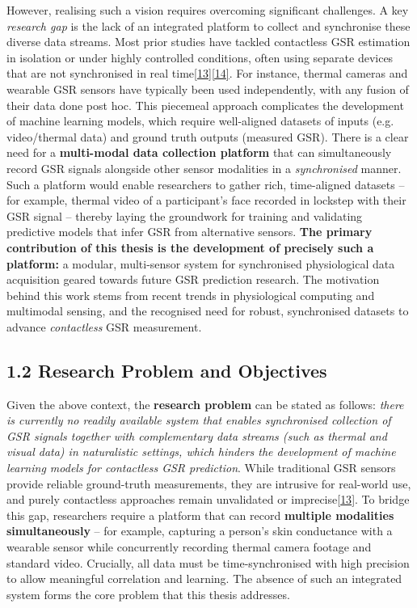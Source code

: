 \documentclass[12pt,a4paper]{article}
\begin{document}
However, realising such a vision requires overcoming significant challenges. A key \emph{research gap} is the lack of an integrated platform to collect and synchronise these diverse data streams. Most prior studies have tackled contactless GSR estimation in isolation or under highly controlled conditions, often using separate devices that are not synchronised in real time\href{docs/thesis_report/draft/Chapter_1__Introduction.md\#L24-L32}{{[}13{]}}\href{docs/thesis_report/draft/Chapter_1__Introduction.md\#L30-L34}{{[}14{]}}. For instance, thermal cameras and wearable GSR sensors have typically been used independently, with any fusion of their data done post hoc. This piecemeal approach complicates the development of machine learning models, which require well-aligned datasets of inputs (e.g. video/thermal data) and ground truth outputs (measured GSR). There is a clear need for a \textbf{multi-modal data collection platform} that can simultaneously record GSR signals alongside other sensor modalities in a \emph{synchronised} manner. Such a platform would enable researchers to gather rich, time-aligned datasets -- for example, thermal video of a participant's face recorded in lockstep with their GSR signal -- thereby laying the groundwork for training and validating predictive models that infer GSR from alternative sensors. \textbf{The primary contribution of this thesis is the development of precisely such a platform:} a modular, multi-sensor system for synchronised physiological data acquisition geared towards future GSR prediction research. The motivation behind this work stems from recent trends in physiological computing and multimodal sensing, and the recognised need for robust, synchronised datasets to advance \emph{contactless} GSR measurement.

\subsection{1.2 Research Problem and Objectives}\label{research-problem-and-objectives}

Given the above context, the \textbf{research problem} can be stated as follows: \emph{there is currently no readily available system that enables synchronised collection of GSR signals together with complementary data streams (such as thermal and visual data) in naturalistic settings, which hinders the development of machine learning models for contactless GSR prediction}. While traditional GSR sensors provide reliable ground-truth measurements, they are intrusive for real-world use, and purely contactless approaches remain unvalidated or imprecise\href{docs/thesis_report/draft/Chapter_1__Introduction.md\#L24-L32}{{[}13{]}}. To bridge this gap, researchers require a platform that can record \textbf{multiple modalities simultaneously} -- for example, capturing a person's skin conductance with a wearable sensor while concurrently recording thermal camera footage and standard video. Crucially, all data must be time-synchronised with high precision to allow meaningful correlation and learning. The absence of such an integrated system forms the core problem that this thesis addresses.
\end{document}

